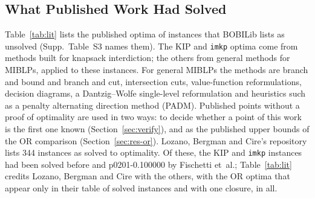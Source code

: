 \documentclass[]{spie}  %
\theoremstyle{plain}
\newcommand{\code}[1]{\texttt{#1}}
\newcommand{\inst}[1]{\mbox{#1}}             %
\begin{document}


\subsection{What Published Work Had Solved}\label{sec:literature}

Table~\ref{tab:lit} lists the published optima of instances that BOBILib lists as unsolved
(Supp.\ Table~S3 names them). The KIP and \code{imkp} optima come from methods built for
knapsack interdiction; the others from general methods for MIBLPs, applied to these instances. For general MIBLPs
the methods are branch and bound\cite{moore1990mixed} and branch and
cut,\cite{denegre2009branch,tahernejad2020mibs} intersection
cuts,\cite{fischetti2016intersection,fischetti2018intersection,fischetti2017new} value-function
reformulations,\cite{mitsos2010global,lozano2017value} decision
diagrams,\cite{lozano2026network,vasquez2025single} a Dantzig--Wolfe single-level
reformulation\cite{lefebvre2025dantzig} and heuristics such as a penalty alternating direction
method (PADM).\cite{kleinert2021computing} Published points without a proof of optimality are
used in two ways: to decide whether a point of this work is the first one known
(Section~\ref{sec:verify}), and as the published upper bounds of the OR comparison
(Section~\ref{sec:res-or}). Lozano, Bergman and Cire's repository lists 344 instances as solved to
optimality.\cite{lozano_dbo_repo} Of these, the KIP and \code{imkp} instances had been solved
before\cite{caprara2016bilevel,fischetti2016monotonicity,weninger_bkpsolver,fischetti2019interdiction}
and \inst{p0201-0.100000} by Fischetti et~al.;\cite{fischetti2017new} Table~\ref{tab:lit} credits
Lozano, Bergman and Cire with the others, with the OR optima that appear only in their table of
solved instances and with one closure, \NumLitLozano{} in all.
\end{document}
